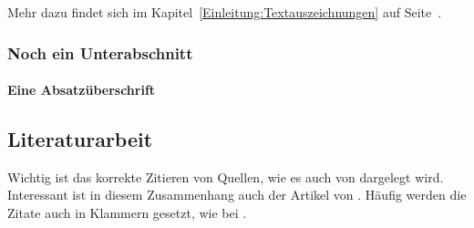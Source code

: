 Mehr dazu findet sich im Kapitel~\ref{Einleitung:Textauszeichnungen} auf Seite~\pageref{Einleitung:Textauszeichnungen}.


\subsubsection{Noch ein Unterabschnitt}

\paragraph{Eine Absatzüberschrift}
\blindtext[1]


\subsection{Literaturarbeit}

Wichtig ist das korrekte Zitieren von Quellen, wie es auch von \cite{Kornmeier2011} dargelegt wird. Interessant ist in diesem Zusammenhang auch der Artikel von \cite{Vixie2007}. Häufig werden die Zitate auch in Klammern gesetzt, wie bei \citep{Kornmeier2011}.

\blindtext[4]